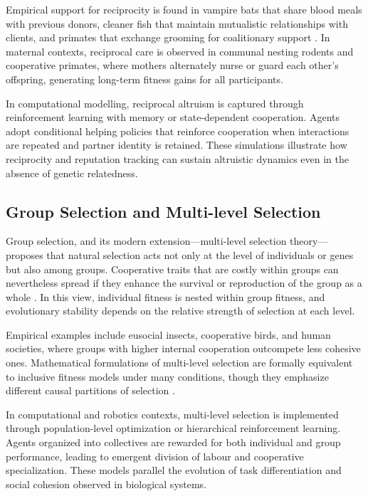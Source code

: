         Empirical support for reciprocity is found in vampire bats that share blood meals with previous donors, cleaner fish that maintain mutualistic relationships with clients, and primates that exchange grooming for coalitionary support \cite{carter2013, bshary2008}.  In maternal contexts, reciprocal care is observed in communal nesting rodents and cooperative primates, where mothers alternately nurse or guard each other’s offspring, generating long-term fitness gains for all participants.
        
        In computational modelling, reciprocal altruism is captured through reinforcement learning with memory or state-dependent cooperation.  Agents adopt conditional helping policies that reinforce cooperation when interactions are repeated and partner identity is retained.  These simulations illustrate how reciprocity and reputation tracking can sustain altruistic dynamics even in the absence of genetic relatedness.

    \subsection{Group Selection and Multi-level Selection}

        Group selection, and its modern extension—multi-level selection theory—proposes that natural selection acts not only at the level of individuals or genes but also among groups.  Cooperative traits that are costly within groups can nevertheless spread if they enhance the survival or reproduction of the group as a whole \cite{wilson2007, okasha2006}.  In this view, individual fitness is nested within group fitness, and evolutionary stability depends on the relative strength of selection at each level.
        
        Empirical examples include eusocial insects, cooperative birds, and human societies, where groups with higher internal cooperation outcompete less cohesive ones.  Mathematical formulations of multi-level selection are formally equivalent to inclusive fitness models under many conditions, though they emphasize different causal partitions of selection \cite{nowak2006}.  
        
        In computational and robotics contexts, multi-level selection is implemented through population-level optimization or hierarchical reinforcement learning.  Agents organized into collectives are rewarded for both individual and group performance, leading to emergent division of labour and cooperative specialization.  These models parallel the evolution of task differentiation and social cohesion observed in biological systems.
        
